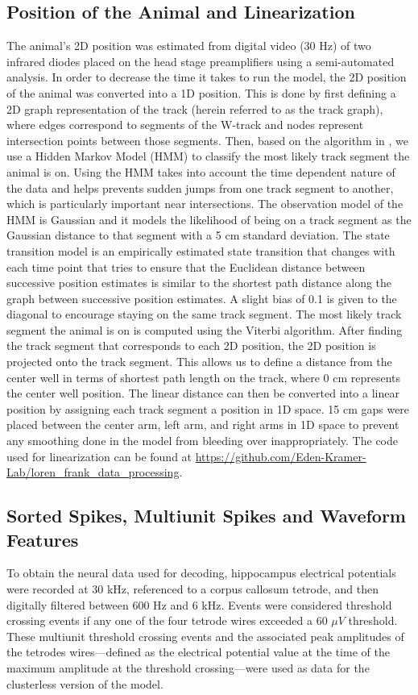 \documentclass[times, twoside]{zHenriquesLab-StyleBioRxiv}
\begin{document}
\subsection*{Position of the Animal and Linearization}
The animal's 2D position was estimated from digital video (30 Hz) of two infrared diodes placed on the head stage preamplifiers using a semi-automated analysis. In order to decrease the time it takes to run the model, the 2D position of the animal was converted into a 1D position. This is done by first defining a 2D graph representation of the track (herein referred to as the track graph), where edges correspond to segments of the W-track and nodes represent intersection points between those segments. Then, based on the algorithm in \cite{NewsonHiddenMarkovmap2009}, we use a Hidden Markov Model (HMM) to classify the most likely track segment the animal is on. Using the HMM takes into account the time dependent nature of the data and helps prevents sudden jumps from one track segment to another, which is particularly important near intersections. The observation model of the HMM is Gaussian and it models the likelihood of being on a track segment as the Gaussian distance to that segment with a 5 cm standard deviation. The state transition model is an empirically estimated state transition that changes with each time point that tries to ensure that the Euclidean distance between successive position estimates is similar to the shortest path distance along the graph between successive position estimates. A slight bias of 0.1 is given to the diagonal to encourage staying on the same track segment. The most likely track segment the animal is on is computed using the Viterbi algorithm. After finding the track segment that corresponds to each 2D position, the 2D position is projected onto the track segment. This allows us to define a distance from the center well in terms of shortest path length on the track, where 0 cm represents the center well position. The linear distance can then be converted into a linear position by assigning each track segment a position in 1D space. 15 cm gaps were placed between the center arm, left arm, and right arms in 1D space to prevent any smoothing done in the model from bleeding over inappropriately. The code used for linearization can be found at \url{https://github.com/Eden-Kramer-Lab/loren_frank_data_processing}.

\subsection*{Sorted Spikes, Multiunit Spikes and Waveform Features}
To obtain the neural data used for decoding, hippocampus electrical potentials were recorded at 30 kHz, referenced to a corpus callosum tetrode, and then digitally filtered between 600 Hz and 6 kHz. Events were considered threshold crossing events if any one of the four tetrode wires exceeded a 60 $\mu V$ threshold. These multiunit threshold crossing events and the associated peak amplitudes of the tetrodes wires---defined as the electrical potential value at the time of the maximum amplitude at the threshold crossing---were used as data for the clusterless version of the model.
\end{document}
